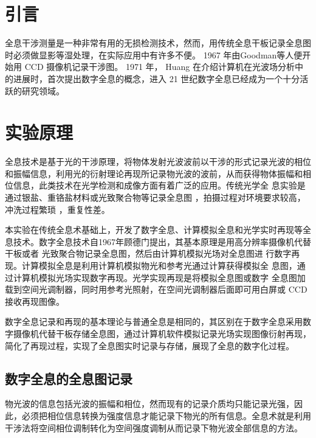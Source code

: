 \documentclass[10pt,a4paper,twocolumn,twoside,UTF8]{ctexart}
\begin{document}
\thispagestyle{firstpage}%
\pagestyle{maincontent}%



	\section{引言}
	全息干涉测量是一种非常有用的无损检测技术，然而，用传统全息干板记录全息图时必须做显影等湿处理，在实际应用中有许多不便。 1967 年由Goodman等人便开始用 CCD 摄像机记录干涉图。 1971 年， Huang 在介绍计算机在光波场分析中的进展时，首次提出数字全息的概念，进入 21 世纪数字全息已经成为一个十分活跃的研究领域。

	\section{实验原理}
	全息技术是基于光的干涉原理，将物体发射光波波前以干涉的形式记录光波的相位和振幅信息，利用光的衍射理论再现所记录物光波的波前，从而获得物体振幅和相位信息，此类技术在光学检测和成像方面有着广泛的应用。传统光学全	息实验是通过银盐、重铬盐材料或光致聚合物等记录全息图 ，拍摄过程对环境要求较高，冲洗过程繁琐 ，重复性差。
	
	本实验在传统全息术基础上，开发了数字全息、计算模拟全息和光学实时再现等全息技术。数字全息技术自1967年顾德门提出，其基本原理是用高分辨率摄像机代替干板或者 光致聚合物记录全息图，然后由计算机模拟光场对全息图进	行数字再现。计算模拟全息是利用计算机模拟物光和参考光通过计算获得模拟全	息图，通过计算机模拟光场实现数字再现。光学实现再现是将模拟全息图或数字	全息图加载到空间光调制器，同时用参考光照射，在空间光调制器后面即可用白屏或 CCD 接收再现图像。
	
	数字全息记录和再现的基本理论与普通全息是相同的，其区别在于数字全息采用数字摄像机代替干板存储全息图，通过计算机软件模拟记录光场实现图像衍射再现，简化了再现过程，实现了全息图实时记录与存储，展现了全息的数字化过程。

	\subsection{数字全息的全息图记录}
	物光波的信息包括光波的振幅和相位，然而现有的记录介质均只能记录光强，因此，必须把相位信息转换为强度信息才能记录下物光的所有信息。全息术就是利用干涉法将空间相位调制转化为空间强度调制从而记录下物光波全部信息的方法。
\end{document}
